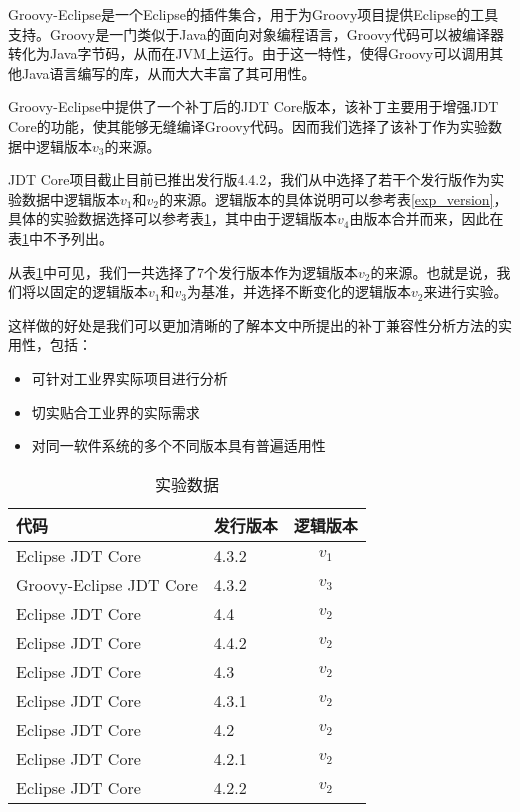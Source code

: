 Groovy-Eclipse是一个Eclipse的插件集合，用于为Groovy项目提供Eclipse的工具支持。Groovy是一门类似于Java的面向对象编程语言，Groovy代码可以被编译器转化为Java字节码，从而在JVM上运行。由于这一特性，使得Groovy可以调用其他Java语言编写的库，从而大大丰富了其可用性。

Groovy-Eclipse中提供了一个补丁后的JDT Core版本，该补丁主要用于增强JDT Core的功能，使其能够无缝编译Groovy代码。因而我们选择了该补丁作为实验数据中逻辑版本$v_3$的来源。

JDT Core项目截止目前已推出发行版4.4.2，我们从中选择了若干个发行版作为实验数据中逻辑版本$v_1$和$v_2$的来源。逻辑版本的具体说明可以参考表\ref {exp_version}，具体的实验数据选择可以参考表\ref {exp_data}，其中由于逻辑版本$v_4$由版本合并而来，因此在表\ref {exp_data}中不予列出。

从表\ref {exp_data}中可见，我们一共选择了7个发行版本作为逻辑版本$v_2$的来源。也就是说，我们将以固定的逻辑版本$v_1$和$v_3$为基准，并选择不断变化的逻辑版本$v_2$来进行实验。

这样做的好处是我们可以更加清晰的了解本文中所提出的补丁兼容性分析方法的实用性，包括：
\begin{itemize}
	\item 可针对工业界实际项目进行分析
	\item 切实贴合工业界的实际需求
	\item 对同一软件系统的多个不同版本具有普遍适用性
\end{itemize}

\begin{table}
	\caption{实验数据}
	\label{exp_data}
	\centering
	\begin{tabular}{llc}
		\toprule[1.5pt]
		{\heiti 代码} & {\heiti 发行版本} & {\heiti 逻辑版本} \\\midrule[1pt]
		Eclipse JDT Core & 4.3.2 & $v_1$ \\
		Groovy-Eclipse JDT Core & 4.3.2 & $v_3$\\
		Eclipse JDT Core & 4.4 & $v_2$\\
		Eclipse JDT Core & 4.4.2 & $v_2$\\
		Eclipse JDT Core & 4.3 & $v_2$\\
		Eclipse JDT Core & 4.3.1 & $v_2$\\
		Eclipse JDT Core & 4.2 & $v_2$\\
		Eclipse JDT Core & 4.2.1 & $v_2$\\
		Eclipse JDT Core & 4.2.2 & $v_2$\\
		\bottomrule[1.5pt]
	\end{tabular}
\end{table}

